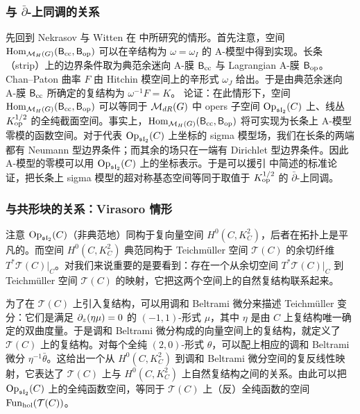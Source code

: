\subsubsection{与 $\bar\partial$-上同调的关系}

先回到 Nekrasov 与 Witten 在 \cite{NW} 中所研究的情形。首先注意，空间 ${\rm Hom}_{\mathcal{M}_H(G)}(\mathsf{B}_{\rm cc}, \mathsf{B}_{\rm op})$ 可以在辛结构为 $\omega=\omega_I$ 的 A-模型中得到实现。长条（strip）上的边界条件取为典范余迷向 A-膜 $\mathsf{B}_{\rm cc}$ 与 Lagrangian A-膜 $\mathsf{B}_{\rm op}$。Chan--Paton 曲率 $F$ 由 Hitchin 模空间上的辛形式 $\omega_J$ 给出。于是由典范余迷向 A-膜 $\mathsf{B}_{\rm cc}$ 所确定的复结构为 $\omega^{-1}F=K$。\cite{NW} 论证：在此情形下，空间 ${\rm Hom}_{\mathcal{M}_H(G)}(\mathsf{B}_{\rm cc}, \mathsf{B}_{\rm op})$ 可以等同于 $\mathcal{M}_{dR}(G)$ 中 opers 子空间 $\mathrm{Op}_{\mathfrak{sl}_2}(C)$ 上、线丛 $K^{{1}/{2}}_{\rm op}$ 的全纯截面空间。事实上，${\rm Hom}_{\mathcal{M}_H(G)}(\mathsf{B}_{\rm cc}, \mathsf{B}_{\rm op})$ 将可实现为长条上 A-模型零模的函数空间。对于代表 $\mathrm{Op}_{\mathfrak{sl}_2}(C)$ 上坐标的 sigma 模型场，我们在长条的两端都有 Neumann 型边界条件；而其余的场只在一端有 Dirichlet 型边界条件。因此 A-模型的零模可以用 $\mathrm{Op}_{\mathfrak{sl}_2}(C)$ 上的坐标表示。于是可以援引 \cite{NW} 中简述的标准论证，把长条上 sigma 模型的超对称基态空间等同于取值于 $K^{{1}/{2}}_{\rm op}$ 的 $\bar{\partial}$-上同调。

\subsubsection{与共形块的关系：Virasoro 情形}\label{HomVirConf}

注意 $\mathrm{Op}_{\mathfrak{sl}_2}(C)$（非典范地）同构于复向量空间 $H^0(C,K^2_C)$，后者在拓扑上是平凡的。而空间 $H^0(C,K^2_C)$ 典范同构于 Teichmüller 空间 $\mathcal{T}(C)$ 的余切纤维 $T^*\mathcal{T}(C)|_{C}$。对我们来说重要的是要看到：存在一个从余切空间 $T^*\mathcal{T}(C)|_{C}$ 到 Teichmüller 空间 $\mathcal{T}(C)$ 的映射，它把这两个空间上的自然复结构联系起来。

为了在 $\mathcal{T}(C)$ 上引入复结构，可以用调和 Beltrami 微分来描述 Teichmüller 变分：它们是满足 $\partial_z(\eta\mu)=0$ 的 $(-1,1)$-形式 $\mu$，其中 $\eta$ 是由 $C$ 上复结构唯一确定的双曲度量。于是调和 Beltrami 微分构成的向量空间上的复结构，就定义了 $\mathcal{T}(C)$ 上的复结构。对每个全纯 $(2,0)$-形式 $\theta$，可以配上相应的调和 Beltrami 微分 $\eta^{-1}\bar{\theta}$。这给出一个从 $H^0(C,K^2_C)$ 到调和 Beltrami 微分空间的复反线性映射，它表达了 $\mathcal{T}(C)$ 上与 $H^0(C,K^2_C)$ 上自然复结构之间的关系。由此可以把 $\mathrm{Op}_{\mathfrak{sl}_2}(C)$ 上的全纯函数空间，等同于 $\mathcal{T}(C)$ 上（反）全纯函数的空间 ${\rm Fun}_{\rm hol}(\mathcal{T}(C))$。


